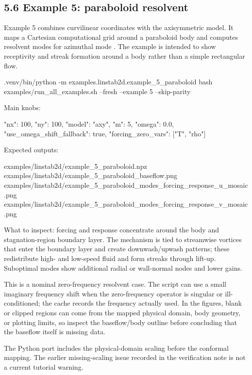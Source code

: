 \documentclass[11pt,a4paper]{article}
\newcommand{\code}[1]{\texttt{\detokenize{#1}}}
\begin{document}
\subsection*{5.6 Example 5: paraboloid resolvent}

Example 5 combines curvilinear coordinates with the axisymmetric model. It maps a Cartesian computational grid around a paraboloid body and computes resolvent modes for azimuthal mode \code{m = 5}. The example is intended to show receptivity and streak formation around a body rather than a simple rectangular flow.

\begin{commandbox}
.venv/bin/python -m examples.linstab2d.example_5_paraboloid
bash examples/run_all_examples.sh --fresh --example 5 --skip-parity
\end{commandbox}

Main knobs:

\begin{snippetbox}
"nx": 100,
"ny": 100,
"model": "axy",
"m": 5,
"omega": 0.0,
"use_omega_shift_fallback": true,
"forcing_zero_vars": ["T", "rho"]
\end{snippetbox}

Expected outputs:

\begin{outputbox}
examples/linstab2d/example_5_paraboloid.npz
examples/linstab2d/example_5_paraboloid_baseflow.png
examples/linstab2d/example_5_paraboloid_modes_forcing_response_u_mosaic.png
examples/linstab2d/example_5_paraboloid_modes_forcing_response_v_mosaic.png
\end{outputbox}

What to inspect: forcing and response concentrate around the body and stagnation-region boundary layer. The mechanism is tied to streamwise vortices that enter the boundary layer and create downwash/upwash patterns; these redistribute high- and low-speed fluid and form streaks through lift-up. Suboptimal modes show additional radial or wall-normal nodes and lower gains.

This is a nominal zero-frequency resolvent case. The script can use a small imaginary frequency shift when the zero-frequency operator is singular or ill-conditioned; the cache records the frequency actually used. In the figures, blank or clipped regions can come from the mapped physical domain, body geometry, or plotting limits, so inspect the baseflow/body outline before concluding that the baseflow itself is missing data.

\begin{notebox}
The Python port includes the physical-domain scaling before the conformal mapping. The earlier missing-scaling issue recorded in the verification note is not a current tutorial warning.
\end{notebox}
\end{document}
